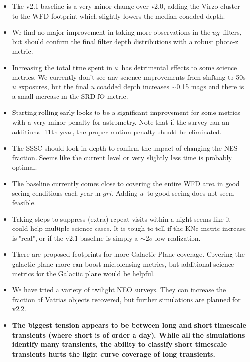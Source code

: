 \begin{itemize}
   \item{The v2.1 baseline is a very minor change over v2.0, adding the Virgo cluster to the WFD footprint which slightly lowers the median coadded depth.}
   \item{We find no major improvement in taking more observations in the $ug$\ filters, but should confirm the final filter depth distributions with a robust photo-z metric.}
   \item{Increasing the total time spent in $u$\ has detrimental effects to some science metrics. We currently don't see any science improvements from shifting to 50s $u$ exposures, but the final $u$ coadded depth increases $\sim$0.15 mags and there is a small increase in the SRD fO metric.}
   \item{Starting rolling early looks to be a significant improvement for some metrics with a very minor penalty for astrometry. Note that if the survey ran an additional 11th year, the proper motion penalty should be eliminated.}
   \item{The SSSC should look in depth to confirm the impact of changing the NES fraction. Seems like the current level or very slightly less time is probably optimal.}
   \item{The baseline currently comes close to covering the entire WFD area in good seeing conditions each year in $gri$. Adding $u$\ to good seeing does not seem feasible.}
   \item{Taking steps to suppress (extra) repeat visits within a night seems like it could help multiple science cases. It is tough to tell if the KNe metric increase is "real", or if the v2.1 baseline is simply a $\sim 2\sigma$ low realization.}
   \item{There are proposed footprints for more Galactic Plane coverage. Covering the galactic plane more can boost microlensing metrics, but additional science metrics for the Galactic plane would be helpful.}
   \item{We have tried a variety of twilight NEO surveys. They can increase the fraction of Vatrias objects recovered, but further simulations are planned for v2.2.}
   \item{{\bf The biggest tension appears to be between long and short timescale transients (where short is of order a day). While all the simulations identify many transients, the ability to classify short timescale transients hurts the light curve coverage of long transients. }}


\end{itemize}

